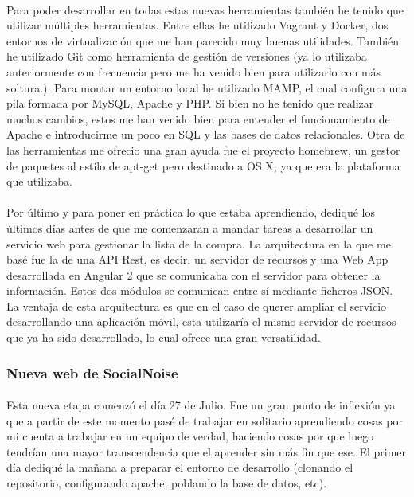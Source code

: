 \documentclass[10pt, a4paper,spanish]{article}
\begin{document}
                \paragraph{}
                Para poder desarrollar en todas estas nuevas herramientas también he tenido que utilizar múltiples herramientas. Entre ellas he utilizado Vagrant y Docker, dos entornos de virtualización que me han parecido muy buenas utilidades. También he utilizado Git como herramienta de gestión de versiones (ya lo utilizaba anteriormente con frecuencia pero me ha venido bien para utilizarlo con más soltura.). Para montar un entorno local he utilizado MAMP, el cual configura una pila formada por MySQL, Apache y PHP. Si bien no he tenido que realizar muchos cambios, estos me han venido bien para entender el funcionamiento de Apache e introducirme un poco en SQL y las bases de datos relacionales. Otra de las herramientas me ofrecio una gran ayuda fue el proyecto homebrew, un gestor de paquetes al estilo de apt-get pero destinado a OS X, ya que era la plataforma que utilizaba.

                \paragraph{}
                Por último y para poner en práctica lo que estaba aprendiendo, dediqué los últimos días antes de que me comenzaran a mandar tareas a desarrollar un servicio web para gestionar la lista de la compra. La arquitectura en la que me basé fue la de una API Rest, es decir, un servidor de recursos y una Web App desarrollada en Angular 2 que se comunicaba con el servidor para obtener la información. Estos dos módulos se comunican entre sí mediante ficheros JSON. La ventaja de esta arquitectura es que en el caso de querer ampliar el servicio desarrollando una aplicación móvil, esta utilizaría el mismo servidor de recursos que ya ha sido desarrollado, lo cual ofrece una gran versatilidad.


            \subsubsection{Nueva web de SocialNoise}

                \paragraph{}
                Esta nueva etapa comenzó el día 27 de Julio. Fue un gran punto de inflexión ya que a partir de este momento pasé de trabajar en solitario aprendiendo cosas por mi cuenta a trabajar en un equipo de verdad, haciendo cosas por que luego tendrían una mayor transcendencia que el aprender sin más fin que ese. El primer día dediqué la mañana a preparar el entorno de desarrollo (clonando el repositorio, configurando apache, poblando la base de datos, etc).
\end{document}
